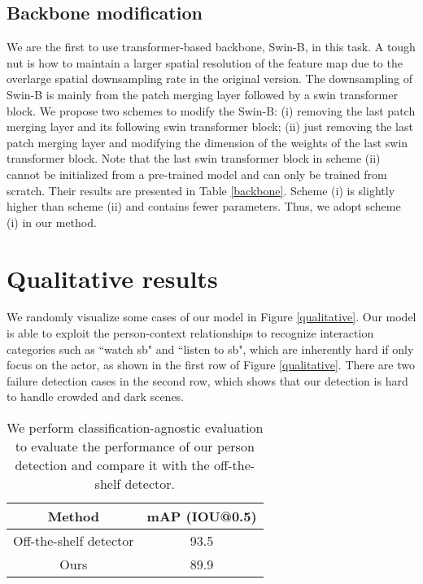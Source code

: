 \documentclass[review]{cvpr}
\begin{document}
\subsection{Backbone modification}
We are the first to use transformer-based backbone, Swin-B, in this task. A tough nut is how to maintain a larger spatial resolution of the feature map due to the overlarge spatial downsampling rate in the original version. The downsampling of Swin-B is mainly from the patch merging layer followed by a swin transformer block. We propose two schemes to modify the Swin-B: (i) removing the last patch merging layer and its following swin transformer block; (ii) just removing the last patch merging layer and modifying the dimension of the weights of the last swin transformer block. Note that the last swin transformer block in scheme (ii) cannot be initialized from a pre-trained model and can only be trained from scratch. Their results are presented in Table \ref{backbone}. Scheme (i) is slightly higher than scheme (ii) and contains fewer parameters. Thus, we adopt scheme (i) in our method.

\section{Qualitative results}
We randomly visualize some cases of our model in Figure \ref{qualitative}. Our model is able to exploit the person-context relationships to recognize interaction categories such as ``watch sb" and ``listen to sb", which are inherently hard if only focus on the actor, as shown in the first row of Figure \ref{qualitative}. There are two failure detection cases in the second row, which shows that our detection is hard to handle crowded and dark scenes. 


\begin{table} [t]
\begin{center}
\small
\begin{tabular}{c|c}
\toprule
Method & mAP (IOU@0.5)  \\
\midrule
Off-the-shelf detector & 93.5 \\
Ours & 89.9 \\
\bottomrule
\end{tabular}
\end{center}
\caption{We perform classification-agnostic evaluation to evaluate the performance of our person detection and compare it with the off-the-shelf detector.}
\label{detection}
\end{table}
\end{document}
